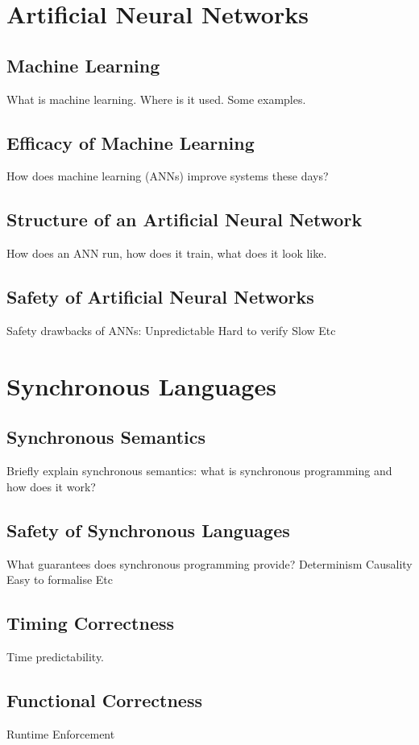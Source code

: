 \section{Artificial Neural Networks}
\subsection{Machine Learning}
What is machine learning. Where is it used. Some examples.

\subsection{Efficacy of Machine Learning}
How does machine learning (ANNs) improve systems these days?

\subsection{Structure of an Artificial Neural Network}
How does an ANN run, how does it train, what does it look like.

\subsection{Safety of Artificial Neural Networks}
Safety drawbacks of ANNs:
Unpredictable
Hard to verify
Slow
Etc


\section{Synchronous Languages}
\subsection{Synchronous Semantics}
Briefly explain synchronous semantics: what is synchronous programming and how does it work?

\subsection{Safety of Synchronous Languages}
What guarantees does synchronous programming provide?
Determinism
Causality
Easy to formalise
Etc

\subsection{Timing Correctness}
Time predictability.

\subsection{Functional Correctness}
Runtime Enforcement


